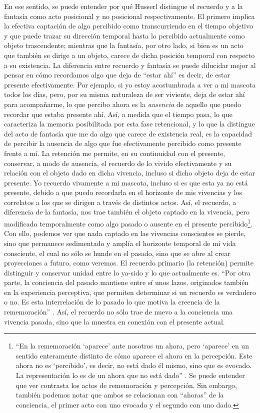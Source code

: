 En ese sentido, se puede entender por qué Husserl distingue el recuerdo
y a la fantasía como acto posicional y no posicional respectivamente. El
primero implica la efectiva captación de algo percibido como
transcurriendo en el tiempo objetivo y que puede trazar su dirección
temporal hasta lo percibido actualmente como objeto trascendente;
mientras que la fantasía, por otro lado, si bien es un acto que también
se dirige a un objeto, carece de dicha posición temporal con respecto a
su existencia. La diferencia entre recuerdo y fantasía se puede
dilucidar mejor al pensar en cómo recordamos algo que deja de ``estar
ahí'' es decir, de estar presente efectivamente. Por ejemplo, si yo
estoy acostumbrada a ver a mi mascota todos los días, pero, por su misma
naturaleza de ser viviente, deja de estar ahí para acompañarme, lo que
percibo ahora es la \emph{ausencia} de aquello que puedo recordar que
estaba presente ahí. Así, a medida que el tiempo pasa, lo que
caracteriza la memoria posibilitada por esta fase retencional, y lo que
la distingue del acto de fantasía que me da algo que carece de
existencia real, es la capacidad de percibir la ausencia de algo que fue
efectivamente percibido como presente frente a mí. La retención me
permite, en su continuidad con el presente, conservar, a modo de
ausencia, el recuerdo de lo vivido efectivamente y su relación con el
objeto dado en dicha vivencia, incluso si dicho objeto deja de estar
presente. Yo recuerdo vivamente a mi mascota, incluso si es que esta ya
no está presente, debido a que puedo recordarla en el horizonte de mis
vivencias y los correlatos a los que se dirigen a través de distintos
actos. Así, el recuerdo, a diferencia de la fantasía, nos trae también
el objeto captado en la vivencia, pero modificado temporalmente como
algo pasado o ausente en el presente percibido\footnote{``En la
  rememoración `aparece' ante nosotros un ahora, pero `aparece' en un
  sentido enteramente distinto de cómo aparece el ahora en la
  percepción. Este ahora no es `percibido', es decir, no está dado él
  mismo, sino que es evocado. La representación lo es de un ahora que no
  está dado'' \cite[§17, p.~62]{husserl2002}. Se puede entender que ver
  contrasta los actos de rememoración y percepción. Sin embargo, también
  podemos notar que ambos se relacionan con ``ahoras'' de la conciencia,
  el primer acto con uno evocado y el segundo con uno dado.}. Con ello,
podemos ver que nada captado en las vivencias conscientes se pierde,
sino que permanece sedimentado y amplía el horizonte temporal de mi vida
consciente, el cual no sólo se hunde en el pasado, sino que se abre al
crear proyecciones a futuro, como veremos. El recuerdo primario (la
retención) permite distinguir y conservar unidad entre lo ya-sido y lo
que actualmente es. ``Por otra parte, la conciencia del pasado mantiene
entre sí unos lazos, originados también en la experiencia perceptiva,
que permiten determinar si un recuerdo es verdadero o no. Es esta
interrelación de lo pasado lo que motiva la creencia de la
rememoración'' \cite[p.~258]{kretschel2014}. Así, el recuerdo no sólo trae de
nuevo a la conciencia una vivencia pasada, sino que la muestra en
conexión con el presente actual.

